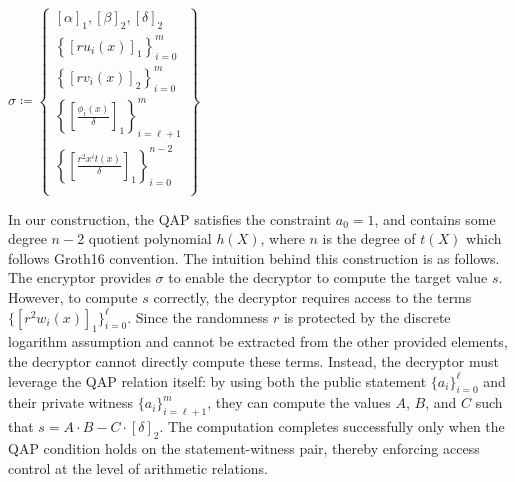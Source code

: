 \newsavebox{\crs}
\setbox\crs\hbox{$
    \sigma \coloneq \left\{
        \begin{array}{l}
            [\alpha]_1, [\beta]_2, [\delta]_2 \\
            \left\{ [ru_i(x)]_1 \right\} ^m_{i=0}\\
            \left\{ [rv_i(x)]_2 \right\} ^m_{i=0} \\
            \left\{ [\frac{\phi_i(x)}{\delta}]_1 \right\} ^m_{i=\ell+1} \\
            \left\{ [\frac{r^2 x^i t(x)}{\delta}]_1 \right\} ^{n-2}_{i=0} \\
        \end{array}
    \right\}
$}
\begin{pchstack}[center]
\end{pchstack}


In our construction, the QAP satisfies the constraint $a_0=1$, and contains some degree $n - 2$ quotient polynomial $h(X)$, where $n$ is the degree of $t(X)$ which follows Groth16 convention. The intuition behind this construction is as follows. The encryptor provides $\sigma$ to enable the decryptor to compute the target value $s$. However, to compute $s$ correctly, the decryptor requires access to the terms $\{[r^2w_i(x)]_1\}_{i=0}^\ell$. Since the randomness $r$ is protected by the discrete logarithm assumption and cannot be extracted from the other provided elements, the decryptor cannot directly compute these terms. Instead, the decryptor must leverage the QAP relation itself: by using both the public statement $\{a_i\}_{i=0}^\ell$ and their private witness $\{a_i\}_{i=\ell+1}^m$, they can compute the values $A$, $B$, and $C$ such that $s = A \cdot B - C \cdot [\delta]_2$. The computation completes successfully only when the QAP condition holds on the statement-witness pair, thereby enforcing access control at the level of arithmetic relations.

